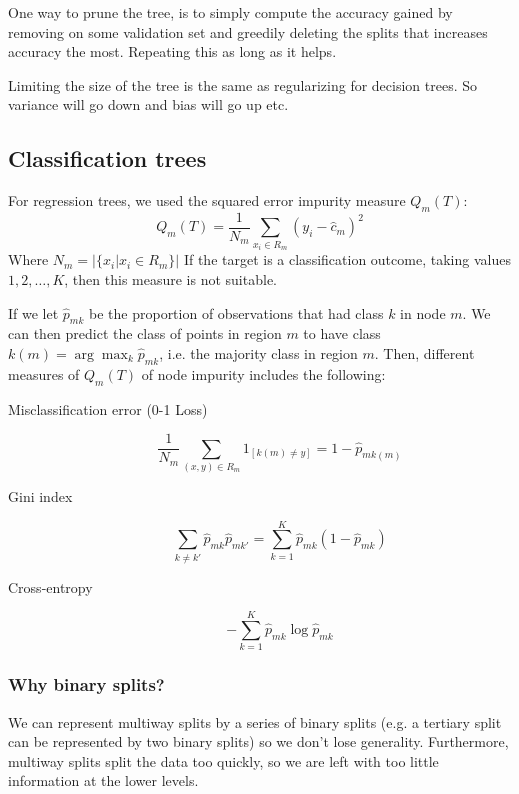     One way to prune the tree, is to simply compute the accuracy gained by 
    removing on some validation set and greedily deleting the splits that 
    increases accuracy the most. Repeating this as long as it helps.
    
    Limiting the size of the tree is the same as regularizing for decision 
    trees. So variance will go down and bias will go up etc.
    
    \subsection{Classification trees}
    For regression trees, we used the squared error impurity measure $Q_m(T)$:
    \begin{equation*}
        Q_m(T)=\frac{1}{N_m}\sum_{x_i \in R_m}(y_i - \hat{c}_m)^2
    \end{equation*}
    Where $N_m = |\{x_i | x_i\in R_m\}|$ If the target is a classification 
    outcome, taking values $1,2,\dots,K$, then this measure is not suitable.
    
    If we let $\hat{p}_{mk}$ be the proportion of observations that had class 
    $k$ in node $m$. We can then predict the class of points in region $m$ to 
    have class $k(m)=\arg\max_k \hat{p}_{mk}$, i.e. the majority class in 
    region $m$. Then, different measures of $Q_m(T)$ of node impurity includes 
    the following:
    \begin{description}
        \item[Misclassification error (0-1 Loss)]
        \begin{equation*}
            \frac{1}{N_m} \sum_{(x,y) \in R_m}1_{[k(m) \neq y]} = 1- 
            \hat{p}_{mk(m)}
        \end{equation*}
        \item[Gini index]
        \begin{equation*}
            \sum_{k\neq k'} \hat{p}_{mk}\hat{p}_{mk'} = 
            \sum_{k=1}^{K}\hat{p}_{mk}(1-\hat{p}_{mk})
        \end{equation*}
        \item[Cross-entropy]
        \begin{equation*}
            - \sum_{k=1}^{K} \hat{p}_{mk} \log \hat{p}_{mk}
        \end{equation*}
    \end{description}
    
    \subsubsection{Why binary splits?}
    We can represent multiway splits by a series of binary splits (e.g. a 
    tertiary split can be represented by two binary splits) so we don't lose 
    generality. Furthermore, multiway splits split the data too quickly, so we 
    are left with too little information at the lower levels.
    
